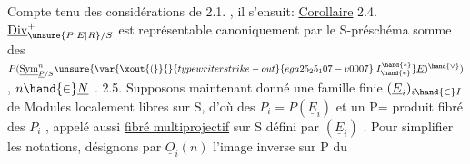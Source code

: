 Compte tenu des considérations de 2.1. , il s'ensuit:
\uline{Corollaire} 2.4. $\underline{\mathrm{Div}}^{+}_{\unsure{P|E|R}/S}$ est représentable canoniquement  par
le S-préschéma somme des $P(\underline{\mathrm{Sym}}^{n}_{\underline{P}/S}\unsure{\var{\xout{(}}{}{typewriter strike-out}{ega25_25_107-v0007}|I^{\hand{*}}_{\hand{*}}}\underline{E})^{\hand{\vee}})$ , $n \hand{\in} \underline{N}$ .
2.5. Supposons maintenant donné une famille finie $(\underline{E}_i)_{i \hand{\in} I}$ de Modules
localement libres sur S, d'où des $P_i = P(\underline{E}_i)$ et un P= produit fibré des
$P_i$ , appelé aussi \uline{fibré multiprojectif} sur S défini par $(\underline{E}_i)$ . Pour
simplifier les notations, désignons par $\underline{O}_i(n)$ l'image inverse sur P du

